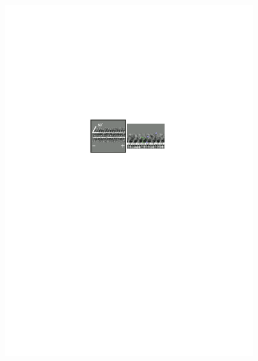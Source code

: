 \documentclass{article}
\begin{document}
\begin{figure}
\begin{minipage}{\textwidth}
   \includegraphics[width=\linewidth]{figures/schematic-binding-angle}
   \label{fig:bindingangle}
 \end{minipage}
 \begin{minipage}{\textwidth}
   \centering

\end{minipage}
\end{figure}
\end{document}
